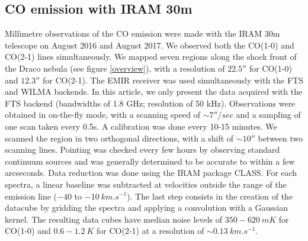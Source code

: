 \documentclass[traditabstract]{aa}
\begin{document}
\subsection{CO emission with IRAM 30m}
Millimetre observations of the CO emission were made with the IRAM 30m telescope on August 2016 and August 2017. 
We observed both the CO(1-0) and CO(2-1) lines simultaneously. We mapped seven regions along the shock front of the Draco nebula 
(see figure \ref{overview}), with a resolution of $22.5''$ for CO(1-0) and $12.3''$ for CO(2-1). The EMIR receiver was used 
simultaneously with the FTS and WILMA backends. In this article, we only present the data acquired with the FTS backend 
(bandwidths of 1.8 GHz; resolution of 50 kHz).
Observations were obtained in on-the-fly mode, with a scanning speed of $\sim 7''/sec$ and a sampling of one scan taken every 0.5s. 
A calibration was done every 10-15 minutes. We scanned the region in two orthogonal directions, with a shift of $\sim 10''$ 
between two scanning lines. Pointing was checked every few hours by observing standard continuum sources and was generally 
determined to be accurate to within a few arcseconds.
Data reduction was done using the IRAM package CLASS. For each spectra, a linear baseline was subtracted at velocities outside 
the range of the emission line ($-40$ to $-10\: km.s^{-1}$). The last step consists in the creation of the datacube by 
gridding the spectra and applying a convolution with a Gaussian kernel. The resulting data cubes have median noise levels of 
$350-620\: mK$ for CO(1-0) and $0.6-1.2\: K$ for CO(2-1) at a resolution of $\sim 0.13\: km.s^{-1}$.

\end{document}
